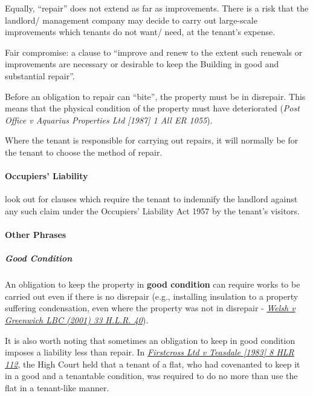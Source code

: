 \documentclass[
]{article}
\begin{document}
Equally, ``repair'' does not extend as far as improvements. There is a
risk that the landlord/ management company may decide to carry out
large-scale improvements which tenants do not want/ need, at the
tenant's expense.

Fair compromise: a clause to ``improve and renew to the extent such
renewals or improvements are necessary or desirable to keep the Building
in good and substantial repair''.

Before an obligation to repair can ``bite'', the property must be in
disrepair. This means that the physical condition of the property must
have deteriorated (\emph{Post Office v Aquarius Properties Ltd
{[}1987{]} 1 All ER 1055}).

Where the tenant is responsible for carrying out repairs, it will
normally be for the tenant to choose the method of repair.

\hypertarget{occupiers-liability}{%
\paragraph{Occupiers' Liability}\label{occupiers-liability}}

look out for clauses which require the tenant to indemnify the landlord
against any such claim under the Occupiers' Liability Act 1957 by the
tenant's visitors.

\hypertarget{other-phrases}{%
\paragraph{Other Phrases}\label{other-phrases}}

\hypertarget{good-condition}{%
\subparagraph{Good Condition}\label{good-condition}}

An obligation to keep the property in \textbf{good condition} can
require works to be carried out even if there is no disrepair (e.g.,
installing insulation to a property suffering condensation, even where
the property was not in disrepair -
\emph{\href{https://uk.practicallaw.thomsonreuters.com/D-008-7715?originationContext=document\&transitionType=PLDocumentLink\&contextData=(sc.Default)\&ppcid=47d8e69b58514ba1976c981efd5911b3\&comp=pluk}{Welsh
v Greenwich LBC (2001) 33 H.L.R. 40}}).

It is also worth noting that sometimes an obligation to keep in good
condition imposes a liability less than repair. In
\emph{\href{https://uk.practicallaw.thomsonreuters.com/D-023-2581?originationContext=document\&transitionType=PLDocumentLink\&contextData=(sc.Default)\&ppcid=47d8e69b58514ba1976c981efd5911b3}{Firstcross
Ltd v Teasdale {[}1983{]} 8 HLR 112}}, the High Court held that a tenant
of a flat, who had covenanted to keep it in a good and a tenantable
condition, was required to do no more than use the flat in a tenant-like
manner.
\end{document}
